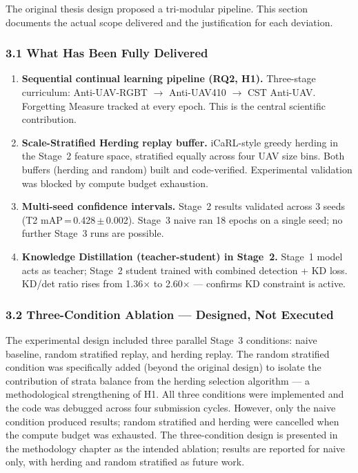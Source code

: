 The original thesis design proposed a tri-modular pipeline. This
section documents the actual scope delivered and the justification
for each deviation.

\subsubsection*{3.1 What Has Been Fully Delivered}

\begin{enumerate}
    \item \textbf{Sequential continual learning pipeline (RQ2, H1).}
    Three-stage curriculum: Anti-UAV-RGBT $\to$ Anti-UAV410 $\to$
    CST Anti-UAV. Forgetting Measure tracked at every epoch.
    This is the central scientific contribution.

    \item \textbf{Scale-Stratified Herding replay buffer.}
    iCaRL-style greedy herding in the Stage~2 feature space,
    stratified equally across four UAV size bins. Both buffers
    (herding and random) built and code-verified. Experimental
    validation was blocked by compute budget exhaustion.

    \item \textbf{Multi-seed confidence intervals.}
    Stage~2 results validated across 3 seeds
    (T2 mAP\,=\,0.428\,$\pm$\,0.002). Stage~3 naive ran 18 epochs
    on a single seed; no further Stage~3 runs are possible.

    \item \textbf{Knowledge Distillation (teacher-student) in Stage~2.}
    Stage~1 model acts as teacher; Stage~2 student trained with
    combined detection + KD loss. KD/det ratio rises from 1.36$\times$
    to 2.60$\times$ — confirms KD constraint is active.
\end{enumerate}

\subsubsection*{3.2 Three-Condition Ablation — Designed, Not Executed}

The experimental design included three parallel Stage~3 conditions:
naive baseline, random stratified replay, and herding replay. The
random stratified condition was specifically added (beyond the original
design) to isolate the contribution of strata balance from the herding
selection algorithm — a methodological strengthening of H1. All three
conditions were implemented and the code was debugged across four
submission cycles. However, only the naive condition produced results;
random stratified and herding were cancelled when the compute budget
was exhausted. The three-condition design is presented in the
methodology chapter as the intended ablation; results are reported for
naive only, with herding and random stratified as future work.

